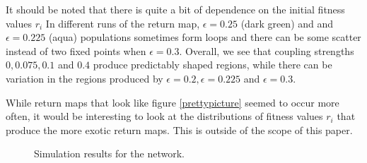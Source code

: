 \documentclass[conference]{IEEEtran}
\begin{document}
It should be noted that there is quite a bit of dependence on the initial fitness values $r_i$   In different runs of the return map, $\epsilon = 0.25$ (dark green) and and $\epsilon = 0.225$ (aqua) populations sometimes form loops and there can be some scatter instead of two fixed points when $\epsilon = 0.3$.  Overall, we see that coupling strengths $0, 0.075, 0.1$ and $0.4$ produce predictably shaped regions, while there can be variation in the regions produced by $\epsilon = 0.2,  \epsilon = 0.225$ and $\epsilon = 0.3$. 


    

While return maps that look like figure \ref{prettypicture} seemed to occur more often, it would be interesting to look at the distributions of fitness values $r_i$ that produce the more exotic return maps.  This is outside of the scope of this paper.
\begin{figure}[!t]
\centering
{}
\hfill
{}
\caption{Simulation results for the network.}
\label{te_avg}
\end{figure}
\end{document}
